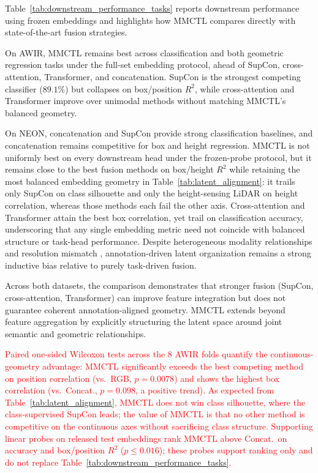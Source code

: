 \documentclass[lettersize,journal]{IEEEtran}
\newcommand{\new}[1]{\textcolor{red}{#1}}
\begin{document}
Table~\ref{tab:downstream_performance_tasks} reports downstream performance using frozen embeddings and highlights how MMCTL compares directly with state-of-the-art fusion strategies.

On AWIR, MMCTL remains best across classification and both geometric regression tasks under the full-set embedding protocol, ahead of SupCon, cross-attention, Transformer, and concatenation. SupCon is the strongest competing classifier ($89.1\%$) but collapses on box/position $R^2$, while cross-attention and Transformer improve over unimodal methods without matching MMCTL's balanced geometry.

On NEON, concatenation and SupCon provide strong classification baselines, and concatenation remains competitive for box and height regression. MMCTL is not uniformly best on every downstream head under the frozen-probe protocol, but it remains close to the best fusion methods on box/height $R^2$ while retaining the most balanced embedding geometry in Table~\ref{tab:latent_alignment}: it trails only SupCon on class silhouette and only the height-sensing LiDAR on height correlation, whereas those methods each fail the other axis. Cross-attention and Transformer attain the best box correlation, yet trail on classification accuracy, underscoring that any single embedding metric need not coincide with balanced structure or task-head performance. Despite heterogeneous modality relationships and resolution mismatch \cite{du2019multiresolution}, annotation-driven latent organization remains a strong inductive bias relative to purely task-driven fusion.

Across both datasets, the comparison demonstrates that stronger fusion (SupCon, cross-attention, Transformer) can improve feature integration but does not guarantee coherent annotation-aligned geometry. MMCTL extends beyond feature aggregation by explicitly structuring the latent space around joint semantic and geometric relationships.

\new{Paired one-sided Wilcoxon tests across the $8$ AWIR folds quantify the continuous-geometry advantage: MMCTL significantly exceeds the best competing method on position correlation (vs.\ RGB, $p{=}0.0078$) and shows the highest box correlation (vs.\ Concat., $p{=}0.098$, a positive trend). As expected from Table~\ref{tab:latent_alignment}, MMCTL does not win class silhouette, where the class-supervised SupCon leads; the value of MMCTL is that no other method is competitive on the continuous axes without sacrificing class structure. Supporting linear probes on released test embeddings rank MMCTL above Concat.\ on accuracy and box/position $R^2$ ($p{\le}0.016$); these probes support ranking only and do not replace Table~\ref{tab:downstream_performance_tasks}.}
\end{document}
